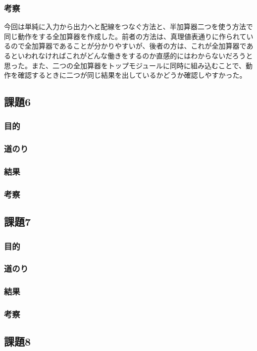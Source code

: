 \documentclass[a4paper]{jarticle}
\begin{document}
\subsubsection{考察}
今回は単純に入力から出力へと配線をつなぐ方法と、半加算器二つを使う方法で同じ動作をする全加算器を作成した。前者の方法は、真理値表通りに作られているので全加算器であることが分かりやすいが、後者の方は、これが全加算器であるといわれなければこれがどんな働きをするのか直感的にはわからないだろうと思った。また、二つの全加算器をトップモジュールに同時に組み込むことで、動作を確認するときに二つが同じ結果を出しているかどうか確認しやすかった。
\subsection{課題6}
\subsubsection{目的}
\subsubsection{道のり}
\subsubsection{結果}
\subsubsection{考察}
\subsection{課題7}
\subsubsection{目的}
\subsubsection{道のり}
\subsubsection{結果}
\subsubsection{考察}
\subsection{課題8}
\end{document}
